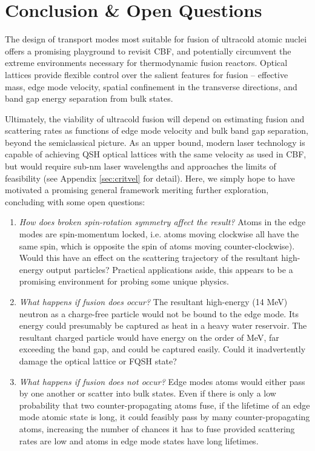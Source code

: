 \documentclass[onecolumn,
               superscriptaddress,
               floatfix,
               longbibliography, 
               showkeys,apl]{revtex4-2}
\begin{document}
\section{Conclusion \& Open Questions}\label{sec:conclusion}

The design of transport modes most suitable for fusion of ultracold atomic nuclei offers a promising playground to revisit CBF, and potentially circumvent the extreme environments necessary for thermodynamic fusion reactors. Optical lattices provide flexible control over the salient features for fusion -- effective mass, edge mode velocity, spatial confinement in the transverse directions, and band gap energy separation from bulk states. 

Ultimately, the viability of ultracold fusion will depend on estimating fusion and scattering rates as functions of edge mode velocity and bulk band gap separation, beyond the semiclassical picture. As an upper bound, modern laser technology is capable of achieving QSH optical lattices with the same velocity as used in CBF, but would require sub-nm laser wavelengths and approaches the limits of feasibility (see Appendix \ref{sec:critvel} for detail). Here, we simply hope to have motivated a promising general framework meriting further exploration, concluding with some open questions:

\begin{enumerate}
\item \textit{How does broken spin-rotation symmetry affect the result?} Atoms in the edge modes are spin-momentum locked, i.e. atoms moving clockwise all have the same spin, which is opposite the spin of atoms moving counter-clockwise). Would this have an effect on the scattering trajectory of the resultant high-energy output particles? Practical applications aside, this appears to be a promising environment for probing some unique physics.
\item \textit{What happens if fusion does occur?} The resultant high-energy (14 MeV) neutron as a charge-free particle would not be bound to the edge mode. Its energy could presumably be captured as heat in a heavy water reservoir. The resultant charged particle would have energy on the order of MeV, far exceeding the band gap, and could be captured easily. Could it inadvertently damage the optical lattice or FQSH state? 
\item \textit {What happens if fusion does not occur?} Edge modes atoms would either pass by one another or scatter into bulk states. Even if there is only a low probability that two counter-propagating atoms fuse, if the lifetime of an edge mode atomic state is long, it could feasibly pass by many counter-propagating atoms, increasing the number of chances it has to fuse provided scattering rates are low and atoms in edge mode states have long lifetimes.
\end{enumerate}
\end{document}
